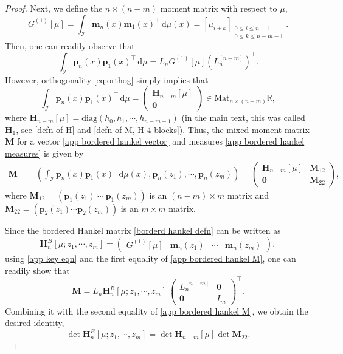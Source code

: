 \documentclass[10pt,a4paper]{amsart}
\newcommand{\R}{\mathbb{R}}
\newcommand{\dd}{\mathrm{d}}
\begin{document}
\begin{proof}
Next, we define the $n \times (n-m)$ moment matrix with respect to $\mu$,
\[
G^{(1)}[\mu] = \int_{\mathscr I} \bm m_n (x)\bm m_{1} (x)^\top\,\dd\mu(x)=[\mu_{i+k}]_{\substack{0\le i\le n-1\\ 0\le k\le n-m-1}}.
\]
Then, one can readily observe that 
\begin{equation} \label{app key eqn}
\int_{\mathscr I} \bm p_n (x) \bm p_{1} (x)^\top \,\dd\mu = L_n G^{(1)}[\mu] \left( L_n^{[n-m]} \right)^\top.
\end{equation}
However, orthogonality \eqref{eq:orthog} simply implies that
\[
\int_{\mathscr I} \bm p_n (x) \bm p_{1} (x)^\top \,\dd\mu = \begin{pmatrix}
    \bm{H}_{n-m}[\mu]\\
    \bm{0}
\end{pmatrix} \in \mathrm{Mat}_{n \times (n-m)} \R,
\]
where \(\bm{H}_{n-m}[\mu] = \mathrm{diag}(h_0, h_1, \cdots, h_{n-m-1})\) (in the main text, this was called $\bm H_1$, see \eqref{defn of H} and \eqref{defn of M, H 4 blocks}).
Thus, the mixed-moment matrix $\bm{M}$ for a vector \eqref{app bordered hankel vector} and measures \eqref{app bordered hankel measures} is given by
\begin{align} \label{app bordered hankel M}
\bm{M} &= \left(\int_{\mathscr I} \bm p_n(x) \bm p_{1}(x)^\top \dd\mu(x), \bm p_n(z_1), \cdots, \bm p_n (z_m) \right) = \begin{pmatrix}
\bm H_{n-m}[\mu] & \bm M_{12} \\[2pt]
\bm 0    & \bm M_{22}
\end{pmatrix},
\end{align}
where $\bm M_{12} = \left(\bm p_1(z_1)\ \cdots\ \bm p_1(z_m)\right)$ is an $(n-m) \times m$ matrix and $\bm M_{22} = \left(\bm p_2(z_1) \cdots \bm p_2(z_m)\right)$ is an $m \times m$ matrix.

Since the bordered Hankel matrix \eqref{borderd hankel defn} can be written as
\[
\bm H_n^{B}[\mu;z_1,\cdots,z_m]
= \begin{pmatrix} G^{(1)}[\mu] & \bm m_n (z_1) & \cdots & \bm m_n (z_m)\end{pmatrix},
\]
using \eqref{app key eqn} and the first equality of \eqref{app bordered hankel M}, one can readily show that
\begin{equation}
\bm{M} = L_n \bm H_n^{B}[\mu;z_1,\cdots,z_m]\
\begin{pmatrix}
L_n^{[n-m]} & \bm 0\\
\bm 0 & I_m
\end{pmatrix}^\top.
\end{equation}
Combining it with the second equality of \eqref{app bordered hankel M}, we obtain the desired identity,
\[
\det\bm H_n^{B}[\mu;z_1,\cdots,z_m]= \det \bm{H}_{n-m}[\mu] \det \bm M_{22}.
\]
\end{proof}
\end{document}
